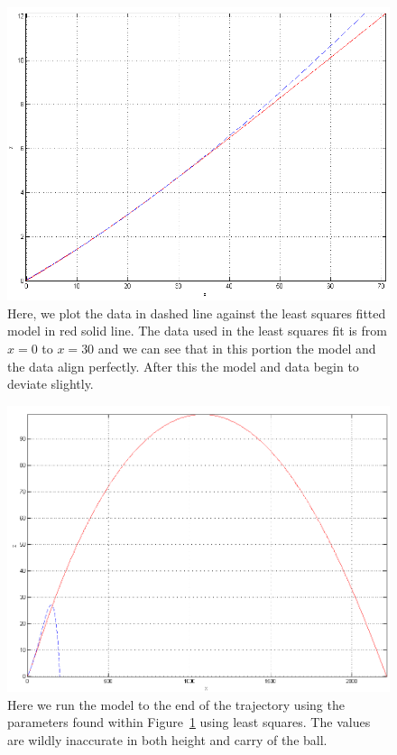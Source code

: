 \begin{figure}
\centering
\includegraphics[scale=0.6]{../images/ls-small-start.png}
\caption[Using a smaller section of data in the least squares method]{Here, we plot the data in dashed
line against the least squares fitted model in red solid line. The data used in the least squares fit
is from $x=0$ to $x=30$ and we can see that in this portion the model and the data align perfectly. After
this the model and data begin to deviate slightly.}
\label{ls-small-start}
\end{figure}

\begin{figure}
\centering
\includegraphics[scale=0.5]{../images/ls-small-full.png}
\caption[Using the parameters from the small least squares run in the full model]{Here we run the model
to the end of the trajectory using the parameters found within Figure~\ref{ls-small-start} using least
squares. The values are wildly inaccurate in both height and carry of the ball.}
\label{ls-small-full}
\end{figure}

